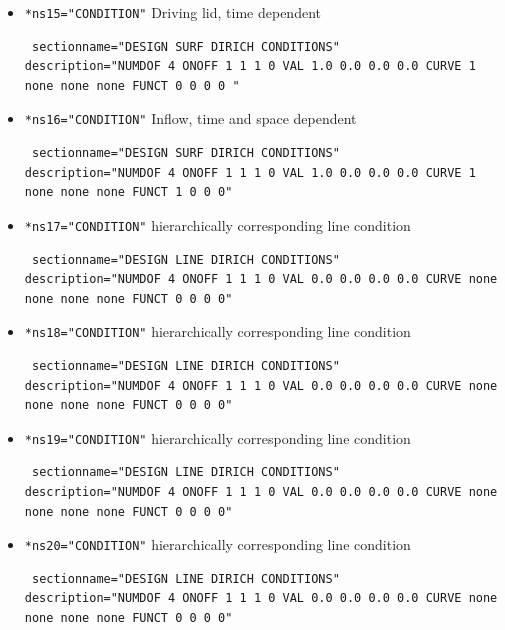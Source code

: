 \begin{itemize}
 \item \verb|*ns15="CONDITION"| \qquad Driving lid, time dependent
\begin{small} \begin{verbatim} sectionname="DESIGN SURF DIRICH CONDITIONS"
description="NUMDOF 4 ONOFF 1 1 1 0 VAL 1.0 0.0 0.0 0.0 CURVE 1 none none none FUNCT 0 0 0 0 "
\end{verbatim} \end{small}

 \item \verb|*ns16="CONDITION"| \qquad Inflow, time and space dependent
\begin{small} \begin{verbatim} sectionname="DESIGN SURF DIRICH CONDITIONS"
description="NUMDOF 4 ONOFF 1 1 1 0 VAL 1.0 0.0 0.0 0.0 CURVE 1 none none none FUNCT 1 0 0 0"
\end{verbatim} \end{small}

 \item \verb|*ns17="CONDITION"| \qquad hierarchically corresponding line condition
\begin{small} \begin{verbatim} sectionname="DESIGN LINE DIRICH CONDITIONS"
description="NUMDOF 4 ONOFF 1 1 1 0 VAL 0.0 0.0 0.0 0.0 CURVE none none none none FUNCT 0 0 0 0"
\end{verbatim} \end{small}

 \item \verb|*ns18="CONDITION"| \qquad hierarchically corresponding line condition
\begin{small} \begin{verbatim} sectionname="DESIGN LINE DIRICH CONDITIONS"
description="NUMDOF 4 ONOFF 1 1 1 0 VAL 0.0 0.0 0.0 0.0 CURVE none none none none FUNCT 0 0 0 0"
\end{verbatim} \end{small}

 \item \verb|*ns19="CONDITION"| \qquad hierarchically corresponding line condition
\begin{small} \begin{verbatim} sectionname="DESIGN LINE DIRICH CONDITIONS"
description="NUMDOF 4 ONOFF 1 1 1 0 VAL 0.0 0.0 0.0 0.0 CURVE none none none none FUNCT 0 0 0 0"
\end{verbatim} \end{small}

 \item \verb|*ns20="CONDITION"| \qquad hierarchically corresponding line condition
\begin{small} \begin{verbatim} sectionname="DESIGN LINE DIRICH CONDITIONS"
description="NUMDOF 4 ONOFF 1 1 1 0 VAL 0.0 0.0 0.0 0.0 CURVE none none none none FUNCT 0 0 0 0"
\end{verbatim} \end{small}


\end{itemize}
